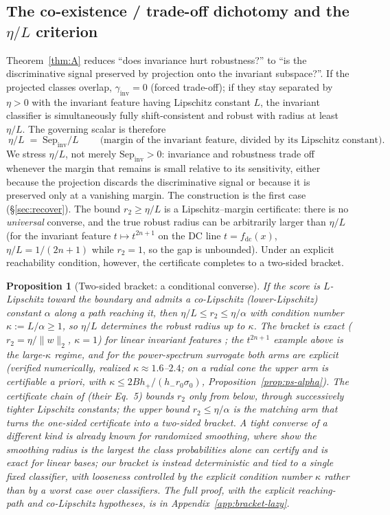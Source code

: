 \documentclass{article}
\newtheorem{proposition}{Proposition}
\theoremstyle{definition}
\newcommand{\fdc}{f_{\mathrm{dc}}}
\newcommand{\Sep}{\mathrm{Sep}}
\begin{document}
\subsection{The co-existence / trade-off dichotomy and the $\eta/L$ criterion}\label{sec:dich}
Theorem~\ref{thm:A} reduces ``does invariance hurt robustness?'' to ``is the discriminative signal preserved by projection onto the invariant subspace?''. If the projected classes overlap, $\gamma_{\mathrm{inv}}=0$ (forced trade-off); if they stay separated by $\eta>0$ with the invariant feature having Lipschitz constant $L$, the invariant classifier is simultaneously fully shift-consistent and robust with radius at least $\eta/L$. The governing scalar is therefore
\[
\boxed{\ \eta/L \;=\; \Sep_{\mathrm{inv}}/L\ } \qquad\text{(margin of the invariant feature, divided by its Lipschitz constant).}
\]
We stress $\eta/L$, not merely $\Sep_{\mathrm{inv}}>0$: invariance and robustness trade off whenever the margin that remains is small relative to its sensitivity, either because the projection discards the discriminative signal or because it is preserved only at a vanishing margin. The \citet{kamath2021canwehaveitall} construction is the first case (\S\ref{sec:recover}). The bound $r_2\ge\eta/L$ is a Lipschitz--margin certificate: there is no \emph{universal} converse, and the true robust radius can be arbitrarily larger than $\eta/L$ (for the invariant feature $t\mapsto t^{2n+1}$ on the DC line $t=\fdc(x)$, $\eta/L=1/(2n+1)$ while $r_2=1$, so the gap is unbounded). Under an explicit reachability condition, however, the certificate completes to a two-sided bracket.
\begin{proposition}[Two-sided bracket: a conditional converse]\label{prop:sandwich}
If the score is $L$-Lipschitz toward the boundary and admits a co-Lipschitz (lower-Lipschitz) constant $\alpha$ along a path reaching it, then $\eta/L\le r_2\le\eta/\alpha$ with condition number $\kappa:=L/\alpha\ge1$, so $\eta/L$ determines the robust radius up to $\kappa$. The bracket is exact ($r_2=\eta/\|w\|_2$, $\kappa=1$) for linear invariant features \citep{hein2017formal}; the $t^{2n+1}$ example above is the large-$\kappa$ regime, and for the power-spectrum surrogate both arms are explicit (verified numerically, realized $\kappa\approx1.6$--$2.4$; on a radial cone the upper arm is certifiable a priori, with $\kappa\le2Bh_+/(h_-r_0\sigma_0)$, Proposition~\ref{prop:ps-alpha}). The certificate chain of \citet{tsuzuku2018lipschitz} (their Eq.~5) bounds $r_2$ only from below, through successively tighter Lipschitz constants; the upper bound $r_2\le\eta/\alpha$ is the matching arm that turns the one-sided certificate into a two-sided bracket. A tight converse of a different kind is already known for randomized smoothing, where \citet{cohen2019certified} show the smoothing radius is the largest the class probabilities alone can certify and is exact for linear bases; our bracket is instead deterministic and tied to a single fixed classifier, with looseness controlled by the explicit condition number $\kappa$ rather than by a worst case over classifiers. The full proof, with the explicit reaching-path and co-Lipschitz hypotheses, is in Appendix~\ref{app:bracket-lazy}.
\end{proposition}
\end{document}
